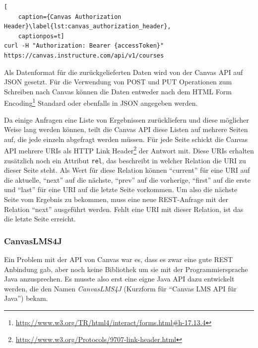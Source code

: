 \begin{lstlisting}[
    caption={Canvas Authorization Header}\label{lst:canvas_authorization_header},
    captionpos=t]
curl -H "Authorization: Bearer {accessToken}" https://canvas.instructure.com/api/v1/courses
\end{lstlisting}

Als Datenformat für die zurückgelieferten Daten wird von der Canvas API auf JSON gesetzt. Für die Verwendung von POST und PUT Operationen zum Schreiben nach Canvas können die Daten entweder nach dem HTML Form Encoding\footnote{\url{http://www.w3.org/TR/html4/interact/forms.html\#h-17.13.4}} Standard oder ebenfalls in JSON angegeben werden. 

Da einige Anfragen eine Liste von Ergebnissen zurückliefern und diese möglicher Weise lang werden können, teilt die Canvas API diese Listen auf mehrere Seiten auf, die jede einzeln abgefragt werden müssen. Für jede Seite schickt die Canvas API mehrere URIs als HTTP Link Header\footnote{\url{http://www.w3.org/Protocols/9707-link-header.html}} der Antwort mit. Diese URIs erhalten zusätzlich noch ein Attribut \texttt{rel}, das beschreibt in welcher Relation die URI zu dieser Seite steht.  Als Wert für diese Relation können \enquote{current} für eine URI auf die aktuelle, \enquote{next} auf die nächste, \enquote{prev} auf die vorherige, \enquote{first} auf die erste und \enquote{last} für eine URI auf die letzte Seite vorkommen. Um also die nächste Seite vom Ergebnis zu bekommen, muss eine neue REST-Anfrage mit der Relation \enquote{next} ausgeführt werden. Fehlt eine URI mit dieser Relation, ist das die letzte Seite erreicht. 


\subsubsection{CanvasLMS4J} %
\label{ssub:canvaslms4j}

Ein Problem mit der API von Canvas war es, dass es zwar eine gute REST Anbindung gab, aber noch keine Bibliothek um sie mit der Programmiersprache Java anzusprechen. Es musste also erst eine eigne Java API dazu entwickelt werden, die den Namen \emph{CanvasLMS4J} (Kurzform für \enquote{Canvas LMS API für Java}) bekam. 

